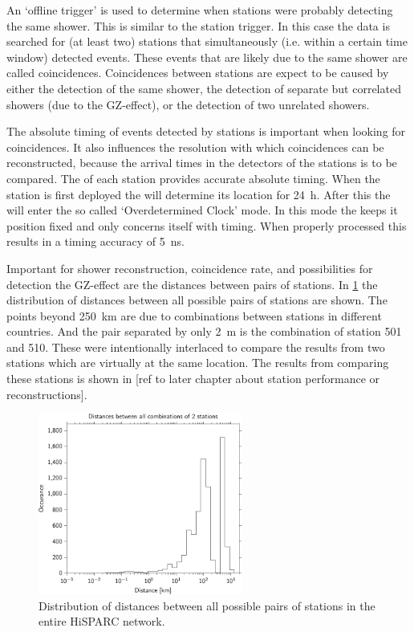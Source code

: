 An `offline trigger' is used to determine when stations were probably detecting the same shower. This is similar to the station trigger. In this case the data is searched for (at least two) stations that simultaneously (i.e. within a certain time window) detected events. These events that are likely due to the same shower are called coincidences. Coincidences between stations are expect to be caused by either the detection of the same shower, the detection of separate but correlated showers (due to the GZ-effect), or the detection of two unrelated showers.

The absolute timing of events detected by stations is important when looking for coincidences. It also influences the resolution with which coincidences can be reconstructed, because the arrival times in the detectors of the stations is to be compared. The \gps of each station provides accurate absolute timing. When the station is first deployed the \gps will determine its location for \SI{24}{\hour}. After this the \gps will enter the so called `Overdetermined Clock' mode. In this mode the \gps keeps it position fixed and only concerns itself with timing. When properly processed this results in a timing accuracy of \SI{5}{\ns}.

Important for shower reconstruction, coincidence rate, and possibilities for detection the GZ-effect are the distances between pairs of stations. In \cref{fig:network_station_distances} the distribution of distances between all possible pairs of stations are shown. The points beyond \SI{250}{\kilo\meter} are due to combinations between stations in different countries. And the pair separated by only \SI{2}{\meter} is the combination of station 501 and 510. These were intentionally interlaced to compare the results from two stations which are virtually at the same location. The results from comparing these stations is shown in [ref to later chapter about station performance or reconstructions].

\begin{figure}
    \centering
    \includegraphics[width=0.6\textwidth]
                    {plots/cluster/network_station_distances}
    \caption{Distribution of distances between all possible pairs of stations in the entire HiSPARC network.}
    \label{fig:network_station_distances}
\end{figure}


